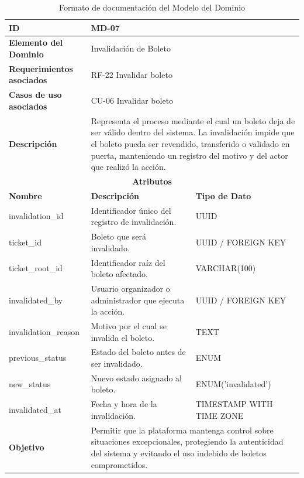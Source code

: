 \documentclass[12pt,letterpaper]{article}
\begin{document}
\begin{table}[H]
\centering
\scriptsize
\renewcommand{\arraystretch}{1.12}
\setlength{\tabcolsep}{4pt}

\begin{tabularx}{\textwidth}{|p{3.2cm}|X|p{3.8cm}|}
\hline
\textbf{ID} & MD-07 & \\ \hline

\textbf{Elemento del Dominio} & 
\multicolumn{2}{X|}{Invalidación de Boleto} \\ \hline

\textbf{Requerimientos asociados} & 
\multicolumn{2}{X|}{RF-22 Invalidar boleto} \\ \hline

\textbf{Casos de uso asociados} & 
\multicolumn{2}{X|}{CU-06 Invalidar boleto} \\ \hline

\textbf{Descripción} & 
\multicolumn{2}{X|}{Representa el proceso mediante el cual un boleto deja de ser válido dentro del sistema. La invalidación impide que el boleto pueda ser revendido, transferido o validado en puerta, manteniendo un registro del motivo y del actor que realizó la acción.} \\ \hline

\multicolumn{3}{|c|}{\textbf{Atributos}} \\ \hline

\textbf{Nombre} & \textbf{Descripción} & \textbf{Tipo de Dato} \\ \hline

invalidation\_id & Identificador único del registro de invalidación. & UUID \\ \hline
ticket\_id & Boleto que será invalidado. & UUID / FOREIGN KEY \\ \hline
ticket\_root\_id & Identificador raíz del boleto afectado. & VARCHAR(100) \\ \hline
invalidated\_by & Usuario organizador o administrador que ejecuta la acción. & UUID / FOREIGN KEY \\ \hline
invalidation\_reason & Motivo por el cual se invalida el boleto. & TEXT \\ \hline
previous\_status & Estado del boleto antes de ser invalidado. & ENUM\\ \hline
new\_status & Nuevo estado asignado al boleto. & ENUM('invalidated') \\ \hline
invalidated\_at & Fecha y hora de la invalidación. & TIMESTAMP WITH TIME ZONE \\ \hline

\textbf{Objetivo} & 
\multicolumn{2}{X|}{Permitir que la plataforma mantenga control sobre situaciones excepcionales, protegiendo la autenticidad del sistema y evitando el uso indebido de boletos comprometidos.} \\ \hline

\end{tabularx}

\caption{Formato de documentación del Modelo del Dominio}
\label{tab:modelo_dominio_invalidacion_boleto}
\normalsize
\end{table}
\end{document}
